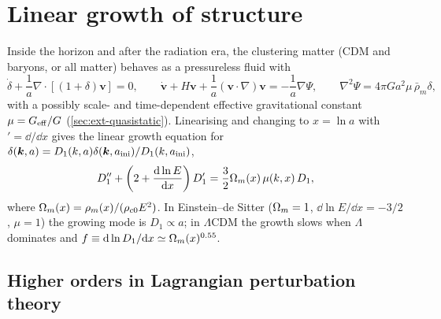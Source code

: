\section{Linear growth of structure}\label{sec:growth-linear}

Inside the horizon and after the radiation era, the clustering matter (CDM and baryons, or all matter) behaves as a
pressureless fluid with
\begin{equation}
\dot\delta+\frac1a\nabla\cdot[(1+\delta)\bm v]=0,\qquad
\dot{\bm v}+H\bm v+\frac1a(\bm v\cdot\nabla)\bm v=-\frac1a\nabla\Psi,\qquad
\nabla^2\Psi=4\pi Ga^2\mu\,\bar\rho_m\delta,
\end{equation}
with a possibly scale- and time-dependent effective gravitational constant $\mu=G_{\rm eff}/G$
(\cref{sec:ext-quasistatic}). Linearising and changing to $x=\ln a$ with $'=\dd/\dd x$ gives the linear growth
equation for $\delta(\bm{k},a)=D_1(k,a)\delta(\bm{k},a_{\rm ini})/D_1(k,a_{\rm ini})$,
\begin{equation}
D_1''+\left(2+\frac{\mathrm{d}\ln E}{\mathrm{d} x}\right)D_1'=\frac32\Omega_m(x)\,\mu(k,x)\,D_1,
\label{eq:growth-D1}
\end{equation}
where $\Omega_m(x)=\rho_m(x)/(\rho_{c0}E^2)$. In Einstein--de Sitter ($\Omega_m=1$, $\dd\ln E/\dd x=-3/2$, $\mu=1$) the
growing mode is $D_1\propto a$; in $\Lambda$CDM the growth slows when $\Lambda$ dominates and
$f\equiv\mathrm{d}\ln D_1/\mathrm{d} x\simeq\Omega_m(x)^{0.55}$.

\subsection{Higher orders in Lagrangian perturbation theory}

